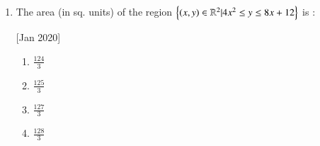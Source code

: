 \documentclass[journal,12pt,twocolumn]{IEEEtran}
\theoremstyle{remark}
\begin{document}
\begin{enumerate}
    \hfill[Jan 2020]
        \begin{enumerate}
            \item $\frac{4-\sqrt{7}}{3}$
            \item $\frac{\sqrt{7}-2}{3}$
            \item $\frac{4-\sqrt{5}}{3}$
            \item $\frac{2}{3}$
        \end{enumerate}

    \item The area (in sq. units) of the region $\left\{(x,y)\in\mathbb{R}^2|4x^2\leq y\leq 8x+12\right\}$ is :
    
    \hfill[Jan 2020]
        \begin{enumerate}
            \item $\frac{124}{3}$
            \item $\frac{125}{3}$
            \item $\frac{127}{3}$
            \item $\frac{128}{3}$
        \end{enumerate}

\end{enumerate}
\end{document}

